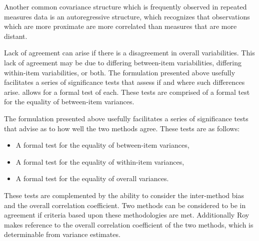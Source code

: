 \documentclass[12pt, a4paper]{report}
\theoremstyle{plain}
\theoremstyle{definition}
\theoremstyle{remark}
\begin{document}
Another common covariance structure which is frequently observed
in repeated measures data is an autoregressive structure,
which recognizes that observations which are more proximate
are more correlated than measures that are more distant.
			

	
	
	
	\newpage		
	Lack of agreement can arise if there is a disagreement in overall variabilities. This lack of agreement may be due to differing between-item variabilities, differing within-item variabilities, or both. The formulation presented above usefully facilitates a series of significance tests that assess if and where such differences arise. \citet{ARoy2009} allows for a formal test of each. These tests are comprised of a formal test for the equality of between-item variances.

	
The formulation presented above usefully facilitates a series of significance tests that advise as to how well the two methods agree. These tests are as follows:
	\begin{itemize}
		\item A formal test for the equality of between-item variances,
		\item A formal test for the equality of within-item variances,
		\item A formal test for the equality of overall variances.
	\end{itemize}
These tests are complemented by the ability to consider the inter-method bias and the overall correlation coefficient. Two methods can be considered to be in agreement if criteria based upon these methodologies are met. Additionally Roy makes reference to the overall correlation coefficient of the two methods, which is determinable from variance estimates.
\end{document}
